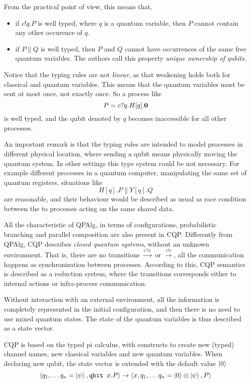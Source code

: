 From the practical point of view, this means that, \begin{itemize} 
\item if $c!q.P$ is well typed, where $q$ is a quantum variable, then $P$ cannot contain any other occurence of $q$.
\item if $P \parallel Q$ is well typed, then $P$ and $Q$ cannot have occurrences of the same free quantum variables. The authors call this property \textit{unique ownership of qubits}.
\end{itemize}

Notice that the typing rules are not \textit{linear}, as that weakening holds both for classical and quantum variables. This means that the quantum variables must be sent at most once, not exactly once. So a process like 
\[P = c?q.H[q].\mathbf{0}\]
is well typed, and the qubit denoted by $q$ becomes inaccessible for all other processes.

An important remark is that the typing rules are intended to model processes in different physical location, where sending a qubit means physically moving the quantum system. In other settings this type system could be not necessary. For example different processes in a quantum computer, manipulating the same set of quantum registers, situations like 
\[ H[q].P \parallel Y[q].Q\]
are reasonable, and their behaviour would be described as usual as race condition between the to processes acting on the same shared data.


All the characteristic of QPAlg, in terms of configurations, probabilistic branching and parallel composition are also present in CQP. Differently from QPAlg, CQP  describes \textit{closed quantum systems}, without an unknown environment. That is, there are no transitions $\xrightarrow{c?x}$ or $\xrightarrow{c!v}$, all the communication happens as synchronization between processes. According to this, CQP semantics is described as a reduction system, where the transitions corresponds either to internal actions or infra-process communication.  


Without interaction with an external environment, all the information is completely represented in the initial configuration, and then there is no need to use mixed quantum states. The state of the quantum variables is thus described as a state vector.


CQP is based on the typed pi calculus, with constructs to create new (typed) channel names, new classical variables and new quantum variables. When declaring  new qubit, the state vector is extended with the default value $\ket{0}$
\[ \langle q_1, \ldots q_n = \ket{\psi}, \texttt{qbit }x.P\rangle \rightarrow \langle x,q_1, \ldots q_n = \ket{0}\otimes\ket{\psi} , P\rangle\]

